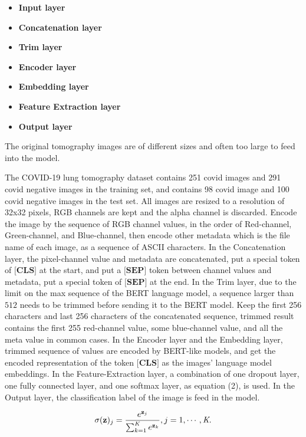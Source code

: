 \documentclass[review]{cvpr}
\begin{document}
\begin{itemize}
\item {\bf Input layer}
\item {\bf Concatenation layer}
\item {\bf Trim layer}
\item {\bf Encoder layer}
\item {\bf Embedding layer}
\item {\bf Feature Extraction layer}
\item {\bf Output layer}
\end{itemize}

\par The original tomography images are of different sizes and often too large to feed into the model.

The COVID-19 lung tomography dataset contains 251 covid images and 291 covid negative images in the training set,
and contains 98 covid image and 100 covid negative images in the test set.
All images are resized to a resolution of 32x32 pixels, RGB channels are kept and the alpha channel is discarded.
Encode the image by the sequence of RGB channel values, in the order of Red-channel, Green-channel, and Blue-channel,
then encode other metadata which is the file name of each image, as a sequence of ASCII characters.
In the Concatenation layer, the pixel-channel value and metadata are concatenated, put a special token of $\textbf{[CLS]}$ at the start,
and put a $\textbf{[SEP]}$ token between channel values and metadata, put a special token of $\textbf{[SEP]}$ at the end.
In the Trim layer, due to the limit on the max sequence of the BERT language model, a sequence larger than $512$ needs to be trimmed before sending it to the BERT model.
Keep the first 256 characters and last 256 characters of the concatenated sequence, trimmed result contains the first 255 red-channel value,
some blue-channel value, and all the meta value in common cases.
In the Encoder layer and the Embedding layer, trimmed sequence of values are encoded by BERT-like models,
and get the encoded representation of the token $\textbf{[CLS]}$ as the images' language model embeddings.
In the Feature-Extraction layer, a combination of one dropout layer, one fully connected layer, and one softmax layer, as equation (2), is used.
In the Output layer, the classification label of the image is feed in the model.

\begin{equation}
  \sigma(\textbf{z})_j = {e^{\textbf{z}_j} \over {\sum_{k=1}^{\textit{K}} e^{\textbf{z}_k}}}, j=1,\cdots,\textit{K}.
\end{equation}
\end{document}
